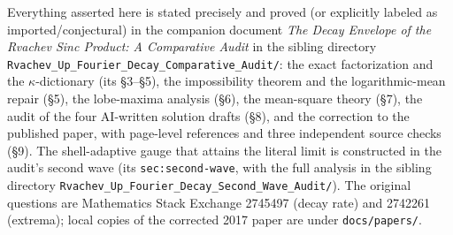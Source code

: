 \documentclass[11pt,oneside]{article}
\theoremstyle{remark}
\begin{document}
Everything asserted here is stated precisely and proved (or explicitly
labeled as imported/conjectural) in the companion document
\emph{The Decay Envelope of the Rvachev Sinc Product: A Comparative
Audit} in the sibling directory
\nolinkurl{Rvachev_Up_Fourier_Decay_Comparative_Audit/}: the exact
factorization and the $\kappa$-dictionary (its \S3--\S5), the
impossibility theorem and the logarithmic-mean repair (\S5), the
lobe-maxima analysis (\S6), the mean-square theory (\S7), the audit of
the four AI-written solution drafts (\S8), and the correction to the
published paper, with page-level references and three independent
source checks (\S9).  The shell-adaptive gauge that attains the
literal limit is constructed in the audit's second wave (its
\nolinkurl{sec:second-wave}, with the full analysis in the sibling
directory \nolinkurl{Rvachev_Up_Fourier_Decay_Second_Wave_Audit/}).
The original questions are Mathematics Stack
Exchange 2745497 (decay rate) and 2742261 (extrema); local copies of
the corrected 2017 paper are under \nolinkurl{docs/papers/}.
\end{document}

